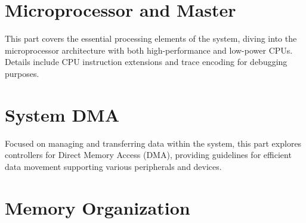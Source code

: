 \documentclass[openany, 10pt]{book}
\begin{document}
\setenglishformatting




\clearpage

\clearpage


\tableofcontents
\clearpage
\listoftables
\clearpage
\listoffigures





\part{Microprocessor and Master}


This part covers the essential processing elements of the system, diving into the microprocessor architecture with both high-performance and low-power CPUs. Details include CPU instruction extensions and trace encoding for debugging purposes.


\part{System DMA}


Focused on managing and transferring data within the system, this part explores controllers for Direct Memory Access (DMA), providing guidelines for efficient data movement supporting various peripherals and devices.


\part{Memory Organization}
\end{document}

